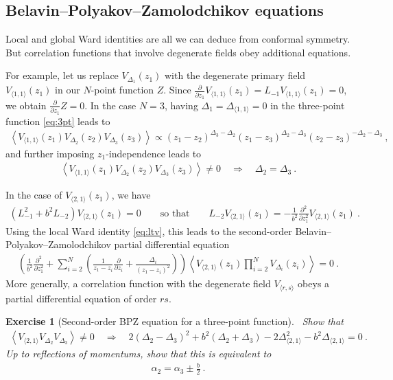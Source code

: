 \documentclass[12pt, a4paper]{article}
\theoremstyle{break}
\newtheorem{exo}{Exercise}[section]
\begin{document}
\subsection{Belavin--Polyakov--Zamolodchikov equations}

Local and global Ward identities are all we can deduce from conformal symmetry. But correlation functions that involve degenerate fields obey additional equations. 

For example, let us replace $V_{\Delta_1}(z_1)$ with the degenerate primary field $V_{\langle 1, 1 \rangle}(z_1)$
in our $N$-point function $Z$. Since $\frac{\partial}{\partial z_1} V_{\langle 1, 1 \rangle}(z_1) = L_{-1} V_{\langle 1, 1 \rangle}(z_1) =0$,
we obtain $\frac{\partial}{\partial z_1} Z =0$. 
In the case $N=3$, having $\Delta_1=\Delta_{\langle 1,1\rangle}=0$ in the three-point function \eqref{eq:3pt} leads to
\begin{align}
 \left< V_{\langle 1, 1 \rangle}(z_1) V_{\Delta_2}(z_2) V_{\Delta_3}(z_3) \right> \propto (z_1-z_2)^{\Delta_3-\Delta_2} (z_1-z_3)^{\Delta_2-\Delta_3} (z_2-z_3)^{-\Delta_2-\Delta_3}\ , 
\end{align}
and further imposing $z_1$-independence leads to 
\begin{align}
 \left< V_{\langle 1, 1 \rangle}(z_1) V_{\Delta_2}(z_2) V_{\Delta_3}(z_3) \right> \neq 0 \quad \Rightarrow \quad \Delta_2=\Delta_3\ .
\end{align}

In the case of $V_{\langle 2, 1 \rangle}(z_1)$, we have  
\begin{align}
\left(L_{-1}^2 + b^2 L_{-2}\right) V_{\langle 2, 1 \rangle}(z_1)  = 0\qquad \text{so that} \qquad L_{-2}V_{\langle 2, 1 \rangle}(z_1) = -\frac{1}{b^2}\frac{\partial^2}{\partial z_1^2} V_{\langle 2, 1 \rangle}(z_1)\ .
\end{align}
Using the local Ward identity \eqref{eq:ltv},
this leads to the second-order Belavin--Polyakov--Zamolodchikov partial differential equation
\begin{align}
 \left( \frac{1}{b^2}\frac{\partial^2}{\partial z_1^2} + \sum_{i=2}^N\left(\frac{1}{z_1-z_i}\frac{\partial}{\partial z_i} +\frac{\Delta_i}{(z_1-z_i)^2}\right) \right)\left< V_{\langle 2, 1 \rangle}(z_1) \prod_{i=2}^N V_{\Delta_i}(z_i) \right>  = 0\ .
 \label{eq:bpz}
\end{align}
More generally, a correlation function with the degenerate field $V_{\langle r,s\rangle}$ obeys a partial differential equation of order $rs$. 

\begin{exo}[Second-order BPZ equation for a three-point function]
 ~\label{exo:bpz3pt}
 Show that 
\begin{align}
 \left< V_{\langle 2, 1 \rangle} V_{\Delta_2} V_{\Delta_3} \right> \neq 0 \quad \Rightarrow \quad 
 2(\Delta_2-\Delta_3)^2 +b^2(\Delta_2+\Delta_3) -2\Delta_{\langle 2, 1 \rangle}^2 -b^2\Delta_{\langle 2, 1 \rangle} = 0\ .
 \end{align}
 Up to reflections of momentums, show that this is equivalent to
 \begin{align}
 \alpha_2 = \alpha_3 \pm \frac{b}{2}\ .
 \label{eq:alpm}
\end{align}
\end{exo}
\end{document}
